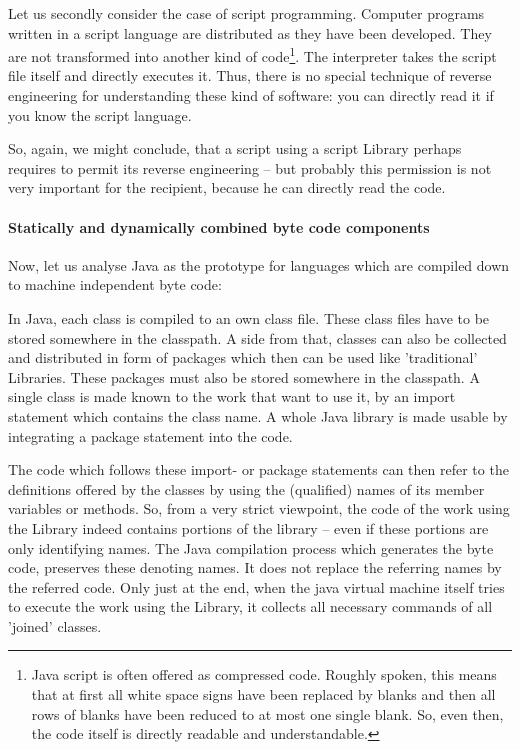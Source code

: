 Let us secondly consider the case of script programming. Computer programs
written in a script language are distributed as they have been developed. They
are not transformed into another kind of code\footnote{Java script is often
offered as compressed code. Roughly spoken, this means that at first all white
space signs have been replaced by blanks and then all rows of blanks have been
reduced to at most one single blank. So, even then, the code itself is directly
readable and understandable.}. The interpreter takes the script file itself and
directly executes it. Thus, there is no special technique of reverse engineering
for understanding these kind of software: you can directly read it if you know
the script language. 

So, again, we might conclude, that a script using a script Library perhaps
requires to permit its reverse engineering -- but probably this permission is
not very important for the recipient, because he can directly read the code.

\paragraph{Statically and dynamically combined byte code components}

Now, let us analyse Java as the prototype for languages which are compiled down
to machine independent byte code:

In Java, each class is compiled to an own class file. These class files have to
be stored somewhere in the classpath. A side from that, classes can also be
collected and distributed in form of packages which then can be used like
'traditional' Libraries. These packages must also be stored somewhere in the
classpath. A single class is made known to the work that want to use it, by an
import statement which contains the class name. A whole Java library is made
usable by integrating a package statement into the code. 

The code which follows these import- or package statements can then refer to the
definitions offered by the classes by using the (qualified) names of its member
variables or methods. So, from a very strict viewpoint, the code of the work
using the Library indeed contains portions of the library -- even if these
portions are only identifying names. The Java compilation process which
generates the byte code, preserves these denoting names. It does not replace the
referring names by the referred code. Only just at the end, when the java
virtual machine itself tries to execute the work using the Library, it collects
all necessary commands of all 'joined' classes.

